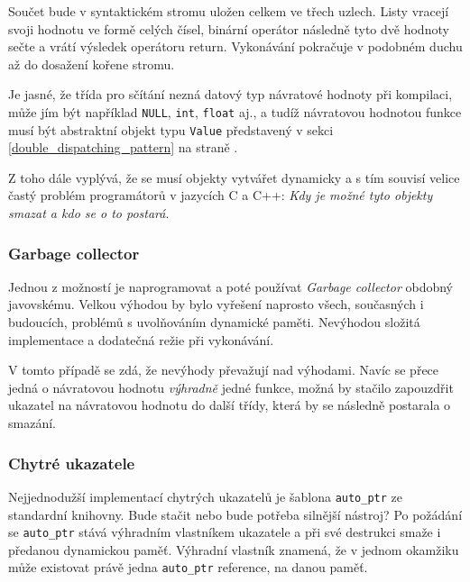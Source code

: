 \documentclass[11pt,twoside,a4paper]{book}
\begin{document}
Součet bude v syntaktickém stromu uložen celkem ve třech uzlech. Listy vracejí svoji hodnotu ve formě celých čísel, binární operátor následně tyto dvě hodnoty sečte a vrátí výsledek operátoru return. Vykonávání pokračuje v podobném duchu až do dosažení kořene stromu.

Je jasné, že třída pro sčítání nezná datový typ návratové hodnoty při kompilaci, může jím být například \texttt{NULL}, \texttt{int}, \texttt{float} aj., a tudíž návratovou hodnotou funkce musí být abstraktní objekt typu \texttt{Value} představený v sekci \ref{double_dispatching_pattern} na straně \pageref{double_dispatching_pattern}.

Z toho dále vyplývá, že se musí objekty vytvářet dynamicky a s tím souvisí velice častý problém programátorů v jazycích C a C++: \textit{Kdy je možné tyto objekty smazat a kdo se o to postará}.


\subsubsection{Garbage collector}


Jednou z možností je naprogramovat a poté používat \textit{Garbage collector} obdobný javovskému. Velkou výhodou by bylo vyřešení naprosto všech, současných i budoucích, problémů s uvolňováním dynamické paměti. Nevýhodou složitá implementace a dodatečná režie při vykonávání.

V tomto případě se zdá, že nevýhody převažují nad výhodami. Navíc se přece jedná o návratovou hodnotu \textit{výhradně} jedné funkce, možná by stačilo zapouzdřit ukazatel na návratovou hodnotu do další třídy, která by se následně postarala o smazání.


\subsubsection{Chytré ukazatele}


Nejjednodužší implementací chytrých ukazatelů je šablona \texttt{auto\_ptr} ze standardní kni\-hov\-ny. Bude stačit nebo bude potřeba silnější nástroj? Po požádání se \texttt{auto\_ptr} stává výhradním vlastníkem ukazatele a při své destrukci smaže i předanou dynamickou paměť. Výhradní vlastník znamená, že v jednom okamžiku může existovat právě jedna \texttt{auto\_ptr} reference, na danou paměť.
\end{document}
